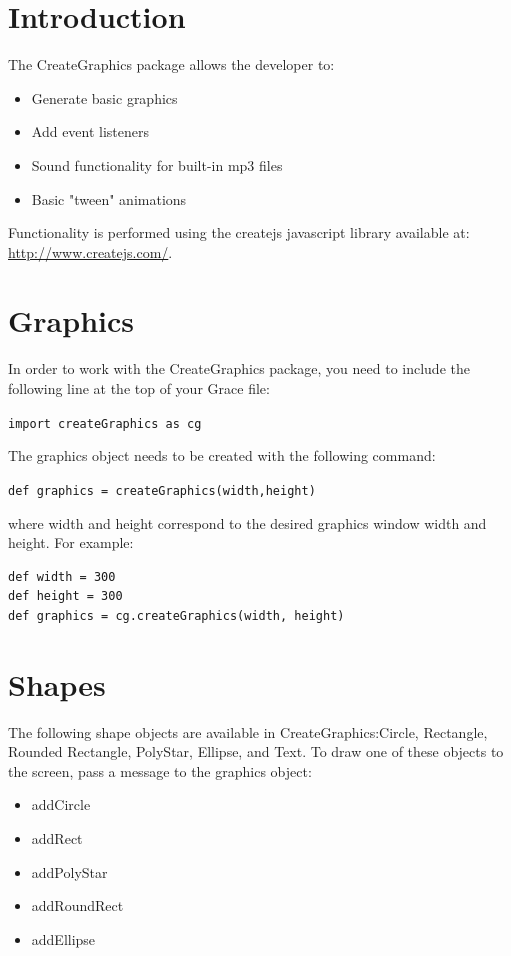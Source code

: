 \documentclass{article}
\begin{document}
\section{Introduction}
The CreateGraphics package allows the developer to:

\begin{itemize}
\item Generate basic graphics
\item Add event listeners
\item Sound functionality for built-in mp3 files
\item Basic "tween" animations
\end{itemize}

Functionality is performed using the createjs javascript library available at:\\
\url{http://www.createjs.com/}. 

\section{Graphics}
In order to work with the CreateGraphics package, you need to include the 
following line at the top of your Grace file:

\texttt{import createGraphics as cg}

The graphics object needs to be created with the following command:

\texttt{def graphics = createGraphics(width,height)} 

where width and height correspond to the desired graphics window width
and height. For example:

\begin{lstlisting}
def width = 300
def height = 300
def graphics = cg.createGraphics(width, height)
\end{lstlisting}

\section{Shapes}
The following shape objects are available in CreateGraphics:Circle, Rectangle, Rounded Rectangle, PolyStar, Ellipse, and Text.
To draw one of these objects to the screen, pass a message to the graphics object:

\begin{itemize}
\item addCircle
\item addRect
\item addPolyStar
\item addRoundRect
\item addEllipse
\end{itemize}
\end{document}
